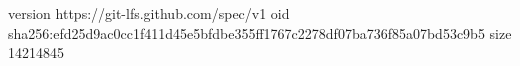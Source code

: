 version https://git-lfs.github.com/spec/v1
oid sha256:efd25d9ac0cc1f411d45e5bfdbe355ff1767c2278df07ba736f85a07bd53c9b5
size 14214845

